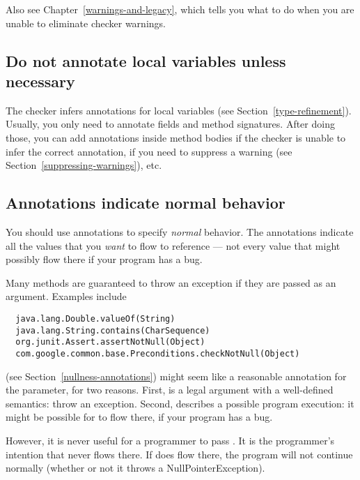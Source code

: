 Also see Chapter~\ref{warnings-and-legacy}, which tells you what to do when
you are unable to eliminate checker warnings.



\subsection{Do not annotate local variables unless necessary\label{tips-local-inference}}

The checker infers annotations for local variables (see
Section~\ref{type-refinement}).  Usually, you only need to annotate fields
and method signatures.  After doing those, you can add annotations inside
method bodies if the checker is unable to infer the correct annotation, if
you need to suppress a warning (see Section~\ref{suppressing-warnings}),
etc.


\subsection{Annotations indicate normal behavior\label{annotate-normal-behavior}}

You should use annotations to specify \emph{normal} behavior.  The
annotations indicate all the values that you \emph{want} to flow to
reference --- not every value that might possibly flow there if your
program has a bug.

Many methods are guaranteed to throw an exception if they are passed 
as an argument.  Examples include

\begin{Verbatim}
  java.lang.Double.valueOf(String)
  java.lang.String.contains(CharSequence)
  org.junit.Assert.assertNotNull(Object)
  com.google.common.base.Preconditions.checkNotNull(Object)
\end{Verbatim}

 (see Section~\ref{nullness-annotations})
might seem like a reasonable annotation for the parameter,
for two reasons.  First,  is a legal argument with a
well-defined semantics:  throw an exception.  Second, 
describes a possible program execution:  it might be possible for
 to flow there, if your program has a bug.


However, it is never useful for a programmer to pass .  It is
the programmer's intention that  never flows there.  If
 does flow there, the program will not continue normally
(whether or not it throws a NullPointerException).

